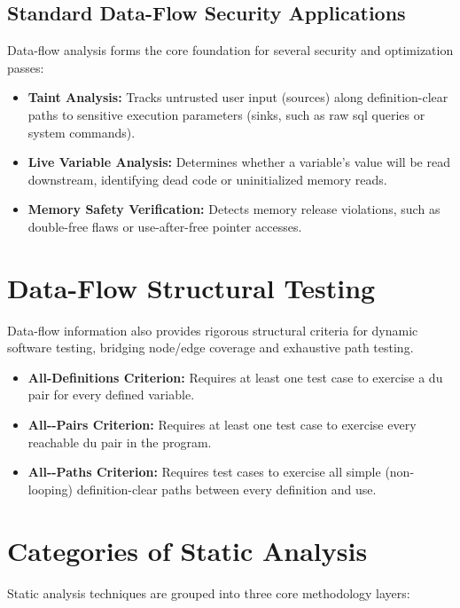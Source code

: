 \subsection{Standard Data-Flow Security Applications}
Data-flow analysis forms the core foundation for several security and optimization passes:
\begin{itemize}
    \item \textbf{Taint Analysis:} Tracks untrusted user input (sources) along definition-clear paths to sensitive execution parameters (sinks, such as raw \gls{sql} queries or system commands).
    \item \textbf{Live Variable Analysis:} Determines whether a variable's value will be read downstream, identifying dead code or uninitialized memory reads.
    \item \textbf{Memory Safety Verification:} Detects memory release violations, such as double-free flaws or use-after-free pointer accesses.
\end{itemize}

\section{Data-Flow Structural Testing}
\label{sec:df_testing}

Data-flow information also provides rigorous structural criteria for dynamic software testing, bridging node/edge coverage and exhaustive path testing.

\begin{itemize}
    \item \textbf{All-Definitions Criterion:} Requires at least one test case to exercise a \gls{du} pair for every defined variable.
    \item \textbf{All--Pairs Criterion:} Requires at least one test case to exercise every reachable \gls{du} pair in the program.
    \item \textbf{All--Paths Criterion:} Requires test cases to exercise all simple (non-looping) definition-clear paths between every definition and use.
\end{itemize}

\section{Categories of Static Analysis}

Static analysis techniques are grouped into three core methodology layers:

